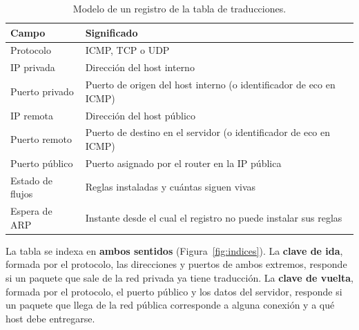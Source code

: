 ﻿\documentclass[10pt,a4paper]{article}
\begin{document}
\begin{table}[H]
\centering
\begin{tabular}{ll}
\toprule
\textbf{Campo} & \textbf{Significado} \\
\midrule
Protocolo        & ICMP, TCP o UDP \\
IP privada       & Dirección del host interno \\
Puerto privado   & Puerto de origen del host interno (o identificador de eco en ICMP) \\
IP remota        & Dirección del host público \\
Puerto remoto    & Puerto de destino en el servidor (o identificador de eco en ICMP) \\
Puerto público   & Puerto asignado por el router en la IP pública \\
Estado de flujos & Reglas instaladas y cuántas siguen vivas \\
Espera de ARP    & Instante desde el cual el registro no puede instalar sus reglas \\
\bottomrule
\end{tabular}
\caption{Modelo de un registro de la tabla de traducciones.}
\label{tab:registro}
\end{table}

La tabla se indexa en \textbf{ambos sentidos} (Figura~\ref{fig:indices}). La
\textbf{clave de ida}, formada por el protocolo, las direcciones y puertos de ambos
extremos, responde si un paquete que sale de la red privada ya tiene traducción. La
\textbf{clave de vuelta}, formada por el protocolo, el puerto público y los datos del
servidor, responde si un paquete que llega de la red pública corresponde a alguna
conexión y a qué host debe entregarse.
\end{document}
